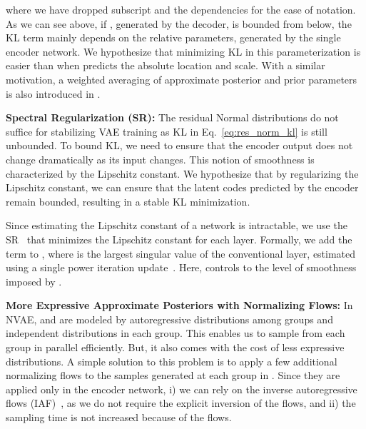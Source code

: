 \documentclass{article}
\begin{document}
where we have dropped subscript  and the dependencies for the ease of notation. As we can see above, if , generated by the decoder, is bounded from below, the KL term mainly depends on the relative parameters, generated by the single encoder network. We hypothesize that minimizing KL in this parameterization is easier than when  predicts the absolute location and scale. With a similar motivation, a weighted averaging of approximate posterior and prior parameters is also introduced in \cite{sonderby2016ladder}.



\textbf{Spectral Regularization (SR):}
The residual Normal distributions do not suffice for stabilizing VAE training as KL in Eq.~\ref{eq:res_norm_kl} is still unbounded. To bound KL, we need to ensure that the encoder output does not change dramatically as its input changes. This notion of smoothness is characterized by the Lipschitz constant. We hypothesize that by regularizing the Lipschitz constant, we can ensure that the latent codes predicted by the encoder remain bounded, resulting in a stable KL minimization. 

Since estimating the Lipschitz constant of a network is intractable, we use the SR~\cite{yoshida2017spectral} that minimizes the Lipschitz constant for each layer. Formally, we add the term  to , where  is the largest singular value of the  conventional layer, estimated using a single power iteration update~\cite{yoshida2017spectral, miyato2018spectral}. Here,  controls to the level of smoothness imposed by .


\textbf{More Expressive Approximate Posteriors with Normalizing Flows:}
In NVAE,  and  are modeled by autoregressive distributions among groups and independent distributions in each group. This enables us to sample from each group in parallel efficiently. But, it also comes with the cost of less expressive distributions.
A simple solution to this problem is to apply a few additional normalizing flows to the samples generated at each group in . Since they are applied only in the encoder network, i) we can rely on the inverse autoregressive flows (IAF)~\cite{kingma2016improved}, as we do not require the explicit inversion of the flows, and ii) the sampling time is not increased because of the flows. 
\end{document}
